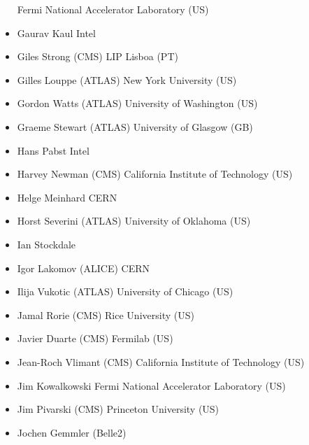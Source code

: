 \begin{itemize}
       \newline Fermi National Accelerator Laboratory (US)
 \item Gaurav Kaul
       \newline Intel
 \item Giles Strong (CMS)
       \newline LIP Lisboa (PT)
 \item Gilles Louppe (ATLAS)
       \newline New York University (US)
 \item Gordon Watts (ATLAS)
       \newline University of Washington (US)
 \item Graeme Stewart (ATLAS)
       \newline University of Glasgow (GB) %
 \item Hans Pabst
       \newline Intel
 \item Harvey Newman (CMS)
       \newline California Institute of Technology (US)
 \item Helge Meinhard
       \newline CERN
 \item Horst Severini (ATLAS)
       \newline University of Oklahoma (US)
 \item Ian Stockdale
 \item Igor Lakomov (ALICE)
       \newline CERN
 \item Ilija Vukotic (ATLAS)
       \newline University of Chicago (US)
 \item Jamal Rorie (CMS)
       \newline Rice University (US)
 \item Javier Duarte (CMS)
       \newline Fermilab (US)
 \item Jean-Roch Vlimant (CMS)
       \newline California Institute of Technology (US)
 \item Jim Kowalkowski
       \newline Fermi National Accelerator Laboratory (US)
 \item Jim Pivarski (CMS)
       \newline Princeton University (US)
 \item Jochen Gemmler (Belle2)

\end{itemize}
